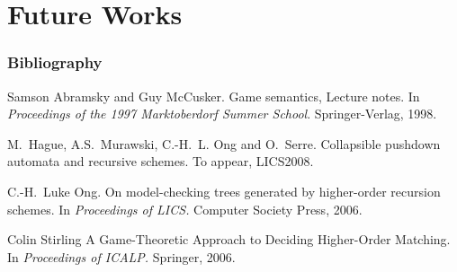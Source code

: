 \section{Future Works}

\begin{frame} \frametitle<presentation>{Bibliography}

  \begin{thebibliography}{10}
  \beamertemplatearticlebibitems
    Samson Abramsky and Guy McCusker.
    \newblock Game semantics, Lecture notes.
    \newblock In {\em Proceedings of the 1997 Marktoberdorf Summer School}. Springer-Verlag, 1998.


    M.~Hague, A.S.~Murawski, C.-H.~L. Ong and O.~Serre.
    \newblock Collapsible pushdown automata and recursive schemes.
    \newblock To appear, LICS2008.

    C.-H.~Luke Ong.
    \newblock On model-checking trees generated by higher-order recursion schemes.
    \newblock In {\em Proceedings of LICS.} Computer Society Press, 2006.

    Colin Stirling
    \newblock A Game-Theoretic Approach to Deciding Higher-Order Matching.
    \newblock In {\em Proceedings of ICALP.} Springer, 2006.

  \end{thebibliography}
\end{frame}




